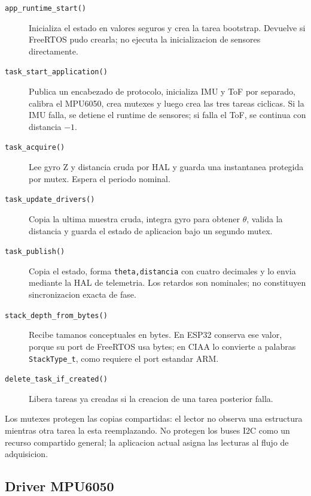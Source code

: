 \documentclass[11pt,a4paper]{article}
\begin{document}
\begin{description}
  \item[\texttt{app\_runtime\_start()}] Inicializa el estado en valores seguros
        y crea la tarea bootstrap. Devuelve si FreeRTOS pudo crearla; no ejecuta
        la inicializacion de sensores directamente.
  \item[\texttt{task\_start\_application()}] Publica un encabezado de protocolo,
        inicializa IMU y ToF por separado, calibra el MPU6050, crea mutexes y
        luego crea las tres tareas ciclicas. Si la IMU falla, se detiene el
        runtime de sensores; si falla el ToF, se continua con distancia $-1$.
  \item[\texttt{task\_acquire()}] Lee gyro Z y distancia cruda por HAL y guarda
        una instantanea protegida por mutex. Espera el periodo nominal.
  \item[\texttt{task\_update\_drivers()}] Copia la ultima muestra cruda, integra
        gyro para obtener $\theta$, valida la distancia y guarda el estado de
        aplicacion bajo un segundo mutex.
  \item[\texttt{task\_publish()}] Copia el estado, forma
        \texttt{theta,distancia} con cuatro decimales y lo envia mediante la HAL
        de telemetria. Los retardos son nominales; no constituyen sincronizacion
        exacta de fase.
  \item[\texttt{stack\_depth\_from\_bytes()}] Recibe tamanos conceptuales en
        bytes. En ESP32 conserva ese valor, porque su port de FreeRTOS usa bytes;
        en CIAA lo convierte a palabras \texttt{StackType\_t}, como requiere el
        port estandar ARM.
  \item[\texttt{delete\_task\_if\_created()}] Libera tareas ya creadas si la
        creacion de una tarea posterior falla.
\end{description}

Los mutexes protegen las copias compartidas: el lector no observa una estructura
mientras otra tarea la esta reemplazando. No protegen los buses I2C como un
recurso compartido general; la aplicacion actual asigna las lecturas al flujo
de adquisicion.

\subsection{Driver MPU6050}
\end{document}
